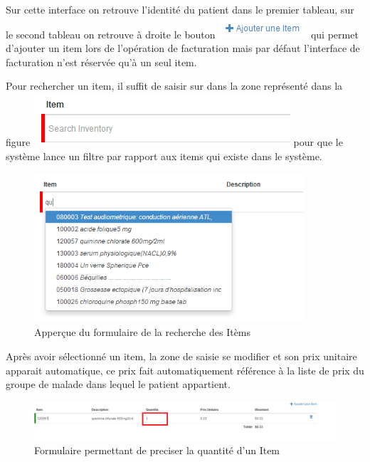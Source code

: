 \documentclass[12pt,a4paper]{report}
\begin{document}
Sur cette interface on retrouve l'identité du patient dans le premier tableau, sur le second tableau on retrouve à droite le bouton \includegraphics[scale=0.7]{pic/AjouterItem.png} qui permet d'ajouter un item lors de l'opération de facturation mais par défaut l'interface de facturation n'est réservée qu'à un seul item.

Pour rechercher un item, il suffit de saisir sur dans la zone représenté dans la figure 
\includegraphics[scale=0.7]{pic/RechercheItem.png} pour que le système lance un filtre par rapport aux items qui existe dans le système.

\begin{figure}[h]
\begin{center}
\includegraphics[width=10cm]{pic/AppRechercheItem.png}
\end{center}
\caption{Apperçue du formulaire de la recherche des Itèms}
\label{Apperçue du formulaire de la recherche des Itèms}
\end{figure}

Après avoir sélectionné un item, la zone de saisie se modifier et son prix unitaire apparait automatique, ce prix fait automatiquement référence à la liste de prix du groupe de malade dans lequel le patient appartient. 


\begin{figure}[h]
\begin{center}
\includegraphics[width=14cm]{pic/UpdateItem.png}
\end{center}
\caption{Formulaire permettant de preciser la quantité d'un Item}
\label{Formulaire permettant de preciser la quantité d'un Item}
\end{figure}
\end{document}
